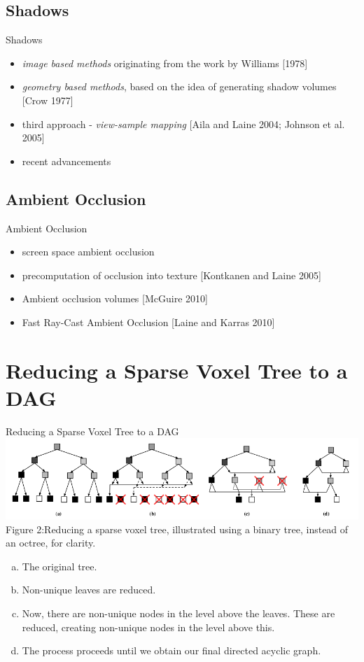 \documentclass{beamer}
\begin{document}
\subsection{Shadows}
\begin{frame}{Shadows}
\begin{itemize}
	\item \textit{image based methods} originating from the work by Williams [1978]
	\item \textit{geometry based methods}, based on the idea of generating shadow volumes [Crow 1977]
	\item third approach - \textit{view-sample mapping} [Aila and Laine 2004; Johnson et al.
2005]
	\item recent advancements
\end{itemize}
\end{frame}

\subsection{Ambient Occlusion}
\begin{frame}{Ambient Occlusion}
\begin{itemize}
	\item screen space ambient occlusion
	\item precomputation of occlusion into texture [Kontkanen and Laine
2005]
	\item Ambient occlusion volumes [McGuire 2010]
	\item Fast Ray-Cast Ambient Occlusion [Laine and Karras 2010]
\end{itemize}
\end{frame}

\section{Reducing a Sparse Voxel Tree to a DAG}
\begin{frame}{Reducing a Sparse Voxel Tree to a DAG}
	\includegraphics[scale=0.37]{fig2}{ Figure 2:Reducing a sparse voxel tree, illustrated using a binary tree, instead of an octree, for clarity.}
	\begin{enumerate}[a.]
		\item{The original tree.}
		\item{Non-unique leaves are reduced.}
		\item{Now, there are non-unique nodes in the level above the leaves. These are reduced, creating non-unique nodes in the level above this.}
		\item{The process proceeds until we obtain our final directed acyclic graph.}
	\end{enumerate}
\end{frame}
\end{document}
